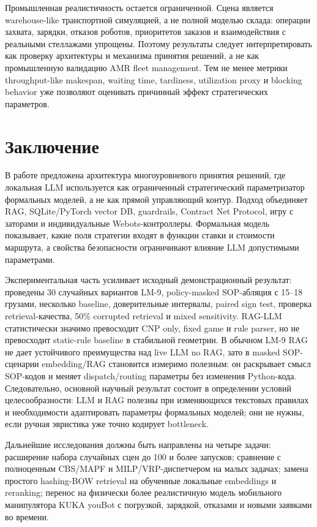 \documentclass[runningheads]{llncs}
\begin{document}
Промышленная реалистичность остается ограниченной. Сцена является warehouse-like транспортной симуляцией, а не полной моделью склада: операции захвата, зарядки, отказов роботов, приоритетов заказов и взаимодействия с реальными стеллажами упрощены. Поэтому результаты следует интерпретировать как проверку архитектуры и механизма принятия решений, а не как промышленную валидацию AMR fleet management. Тем не менее метрики throughput-like makespan, waiting time, tardiness, utilization proxy и blocking behavior уже позволяют оценивать причинный эффект стратегических параметров.

\section{Заключение}

В работе предложена архитектура многоуровневого принятия решений, где локальная LLM используется как ограниченный стратегический параметризатор формальных моделей, а не как прямой управляющий контур. Подход объединяет RAG, SQLite/PyTorch vector DB, guardrails, Contract Net Protocol, игру с заторами и индивидуальные Webots-контроллеры. Формальная модель показывает, какие поля стратегии входят в функции ставки и стоимости маршрута, а свойства безопасности ограничивают влияние LLM допустимыми параметрами.

Экспериментальная часть усиливает исходный демонстрационный результат: проведены 30 случайных вариантов LM-9, policy-masked SOP-абляция с 15--18 грузами, несколько baseline, доверительные интервалы, paired sign test, проверка retrieval-качества, 50\% corrupted retrieval и mixed sensitivity. RAG-LLM статистически значимо превосходит CNP only, fixed game и rule parser, но не превосходит static-rule baseline в стабильной геометрии. В обычном LM-9 RAG не дает устойчивого преимущества над live LLM no RAG, зато в masked SOP-сценарии embedding/RAG становится измеримо полезным: он раскрывает смысл SOP-кодов и меняет dispatch/routing параметры без изменения Python-кода. Следовательно, основной научный результат состоит в определении условий целесообразности: LLM и RAG полезны при изменяющихся текстовых правилах и необходимости адаптировать параметры формальных моделей; они не нужны, если ручная эвристика уже точно кодирует bottleneck.

Дальнейшие исследования должны быть направлены на четыре задачи: расширение набора случайных сцен до 100 и более запусков; сравнение с полноценным CBS/MAPF и MILP/VRP-диспетчером на малых задачах; замена простого hashing-BOW retrieval на обученные локальные embeddings и reranking; перенос на физически более реалистичную модель мобильного манипулятора KUKA youBot с погрузкой, зарядкой, отказами и новыми заявками во времени.



\end{document}

